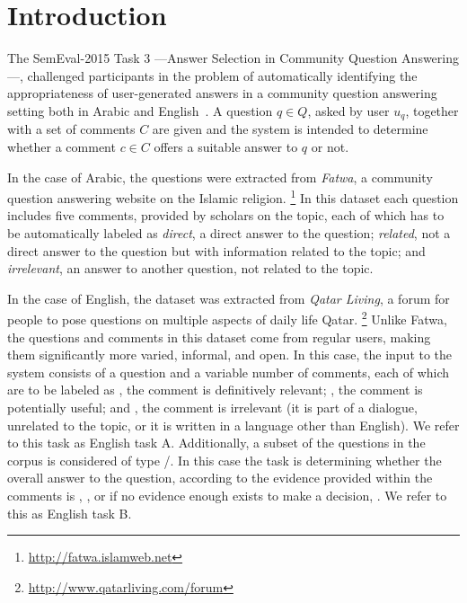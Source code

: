 \section{Introduction}
\label{sec:intro}


The SemEval-2015 Task 3 ---Answer Selection in Community Question Answering---, 
challenged participants in the problem of automatically identifying the 
appropriateness of user-generated answers in a community question answering 
setting both in Arabic and English~\cite{Marquez-EtAl:2015:SemEval}. A question 
$q\in Q$, asked by user $u_q$, together with a set of comments $C$ are given and 
the system is intended to determine whether a comment $c\in C$ offers a suitable 
answer to $q$ or not. 

In the case of Arabic, the questions were extracted from \textit{Fatwa}, a 
community question answering website on the Islamic religion.%
\footnote{\url{http://fatwa.islamweb.net}} 
In this dataset each question includes five comments, provided by scholars on 
the topic, each of which has to be automatically labeled as 
\Ni \textit{direct}, a direct answer to the question;
\Nii \textit{related}, not a direct answer to the question but with information 
related to the topic; and 
\Niii \textit{irrelevant}, an answer to another question, not related to the 
topic. 

In the case of English, the dataset was extracted from \textit{Qatar Living}, 
a forum for people to pose questions on multiple aspects of daily life Qatar.%
\footnote{\url{http://www.qatarliving.com/forum}}
Unlike Fatwa, the questions and comments in this dataset come from regular 
users, making them significantly more varied, informal, and open. In this case, 
the input to the system consists of a question and a variable number of 
comments, each of which are to be labeled as 
\Ni \good, the comment is definitively relevant; 
\Nii \pot, the comment is potentially useful; and 
\Niii \bad, the comment is irrelevant (\eg it is part of a dialogue, unrelated 
to the topic, or it is written in a language other than English). 
We refer to this task as English task A. Additionally, a subset of the 
questions in the corpus is considered of type \yes/\no.
In this case the task is determining whether the overall answer to the question, 
according to the evidence provided within the comments is 
\Ni \yes, 
\Nii \no, or if no evidence enough exists to make a decision, 
\Niii \unsure. 
We refer to this as English task B. 

